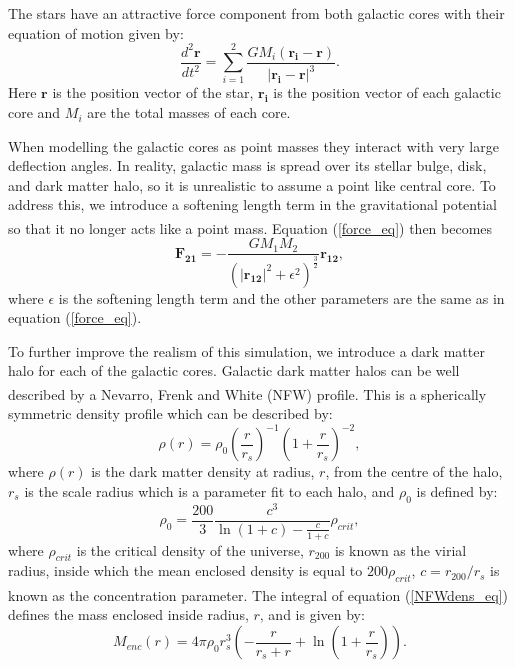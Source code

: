 \documentclass[10pt, twocolumn]{revtex4}    %
\begin{document}
The stars have an attractive force component from both galactic cores with their equation of motion given by:
\begin{equation}
\frac{d^2\pmb{r}}{dt^2} = \sum^2_{i=1}\frac{GM_i(\pmb{r_{i}}-\pmb{r})}{|\pmb{r_{i}}-\pmb{r}|^3}.
\label{motion_eq}
\end{equation}
Here $\pmb{r}$ is the position vector of the star, $\pmb{r_{i}}$ is the position vector of each galactic core and $M_{i}$ are the total masses of each core.

When modelling the galactic cores as point masses they interact with very large deflection angles. In reality, galactic mass is spread over its stellar bulge, disk, and dark matter halo, so it is unrealistic to assume a point like central core. To address this, we introduce a softening length term in the gravitational potential so that it no longer acts like a point mass. Equation (\ref{force_eq}) then becomes\textsuperscript{\cite{C.C.DyerSofteningNbodysimulations1993}}
\begin{equation}
\pmb{F_{21}} = -\frac{ G M_{1} M_{2} } { (|\pmb{r_{12}}|^2+\epsilon^2)^\frac{3}{2}} \pmb{r_{12}},
\label{softened_eq}
\end{equation}
where $\epsilon$ is the softening length term and the other parameters are the same as in equation (\ref{force_eq}). 

To further improve the realism of this simulation, we introduce a dark matter halo for each of the galactic cores. Galactic dark matter halos can be well described by a Nevarro, Frenk and White (NFW) profile.\textsuperscript{\cite{NavarroStructureColdDark1996}} This is a spherically symmetric density profile which can be described by:
\begin{equation}
\rho(r) = \rho_0\left(\frac{r}{r_s}\right)^{-1}\left(1+\frac{r}{r_s}\right)^{-2},
\label{NFWdens_eq}
\end{equation}
where $\rho(r)$ is the dark matter density at radius, $r$, from the centre of the halo, $r_s$ is the scale radius which is a parameter fit to each halo, and $\rho_0$ is defined by:
\begin{equation}
\rho_0 = \frac{200}{3}\frac{c^3}{\ln(1+c)-\frac{c}{1+c}}\rho_{crit},
\label{rho0_eq}
\end{equation}
where $\rho_{crit}$ is the critical density of the universe, $r_{200}$ is known as the virial radius, inside which the mean enclosed density is equal to $200\rho_{crit}$, $c=r_{200}/r_s$ is known as the concentration parameter.\textsuperscript{\cite{ReadLocalDarkMatter2014}} The integral of equation (\ref{NFWdens_eq}) defines the mass enclosed inside radius, $r$, and is given by:
\begin{equation}
M_{enc}(r)=4\pi\rho_0r_s^3\left(-\frac{r}{r_s+r}+\ln\left(1+\frac{r}{r_s}\right)\right).
\label{Menc_eq}
\end{equation}
\end{document}
